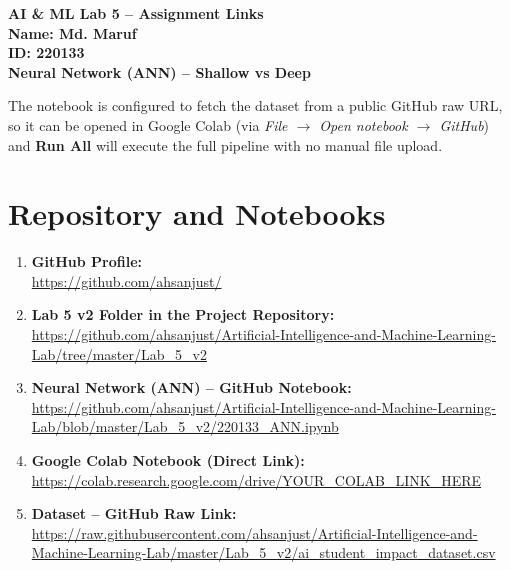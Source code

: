\documentclass[11pt]{article}
\begin{document}
\begin{center}
    {\huge \textbf{AI \& ML Lab 5 -- Assignment Links}} \\[0.3cm]
    {\Large \textbf{Name: Md. Maruf}} \\[0.1cm]
    {\Large \textbf{ID: 220133}} \\[0.4cm]
    {\large \textbf{Neural Network (ANN) -- Shallow vs Deep}} \\[0.5cm]
\end{center}

\noindent The notebook is configured to fetch the dataset from a public GitHub raw URL,
so it can be opened in Google Colab (via \emph{File $\rightarrow$ Open notebook
$\rightarrow$ GitHub}) and \textbf{Run All} will execute the full pipeline with no
manual file upload.

\section*{Repository and Notebooks}

\begin{enumerate}[leftmargin=*, itemsep=0.3cm]

    \item \textbf{GitHub Profile:} \\
    \url{https://github.com/ahsanjust/}

    \item \textbf{Lab 5 v2 Folder in the Project Repository:} \\
    \url{https://github.com/ahsanjust/Artificial-Intelligence-and-Machine-Learning-Lab/tree/master/Lab_5_v2}

    \item \textbf{Neural Network (ANN) -- GitHub Notebook:} \\
    \url{https://github.com/ahsanjust/Artificial-Intelligence-and-Machine-Learning-Lab/blob/master/Lab_5_v2/220133_ANN.ipynb}

    \item \textbf{Google Colab Notebook (Direct Link):} \\
    \url{https://colab.research.google.com/drive/YOUR_COLAB_LINK_HERE}

    \item \textbf{Dataset -- GitHub Raw Link:} \\
    \url{https://raw.githubusercontent.com/ahsanjust/Artificial-Intelligence-and-Machine-Learning-Lab/master/Lab_5_v2/ai_student_impact_dataset.csv}

\end{enumerate}
\end{document}
